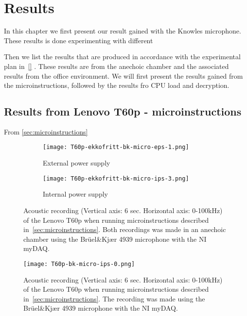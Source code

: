 \chapter{Results}
\label{chp:results} 
In this chapter we first present our result gained with the Knowles microphone.
These results is done experimenting with different 

Then we list the results that are produced in accordance with the experimental plan in~\autoref{} . 
These results are from the anechoic chamber and the associated results from the office environment.  
We will first present the results gained from the microinstructions, followed by the results fro CPU load and decryption. 

\section{Results from Lenovo T60p - microinstructions}\label{sec:t60p_results_micro}
From \autoref{sec:microinstructions} 

\newpage
\begin{wrapfigure}{r}{1\textwidth}
	\begin{subfigure}{1\textwidth}
	    \centering
	    \texttt{[image: T60p-ekkofritt-bk-micro-eps-1.png]}
	    \caption{External power supply}
	    \label{fig:T60p-ekkofritt-bk-micro-eps-1}
    \end{subfigure}
    \begin{subfigure}{1\textwidth}
	    \centering
    	\texttt{[image: T60p-ekkofritt-bk-micro-ips-3.png]}
    	\caption{Internal power supply}
    	\label{fig:T60p-ekkofritt-bk-micro-ips-3}
    \end{subfigure}
    \caption{Acoustic recording (Vertical axis: 6 sec. Horizontal axis: 0-100kHz) of the Lenovo T60p when running microinstructions described in~\autoref{sec:microinstructions}. Both recordings was made in an anechoic chamber using the Brüel\&Kjær 4939 microphone with the NI myDAQ. }
	\label{fig:T60p-ekkofritt-bk-cpuload}
\end{wrapfigure}

\begin{wrapfigure}{r}{1\textwidth}
    \centering
    \texttt{[image: T60p-bk-micro-ips-0.png]}
    \caption{Acoustic recording (Vertical axis: 6 sec. Horizontal axis: 0-100kHz) of the Lenovo T60p when running microinstructions described in~\autoref{sec:microinstructions}. The recording was made using the Brüel\&Kjær 4939 microphone with the NI myDAQ. }
    \label{fig:T60p-bk-micro-ips-0}
\end{wrapfigure}

